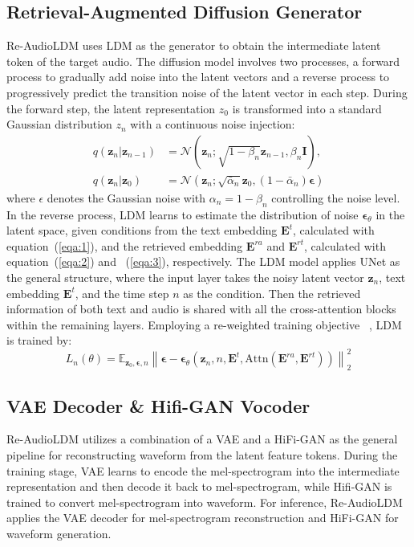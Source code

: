 \documentclass{article}
\begin{document}
\subsection{Retrieval-Augmented Diffusion Generator}
Re-AudioLDM uses LDM as the generator to obtain the intermediate latent token of the target audio. The diffusion model involves two processes, a forward process to gradually add noise into the latent vectors and a reverse process to progressively predict the transition noise of the latent vector in each step. During the forward step, the latent representation $z_0$ is transformed into a standard Gaussian distribution $z_n$ with a continuous noise injection:
\begin{align}
q(\boldsymbol{z}_{n}|\boldsymbol{z}_{n-1})&=\mathcal{N}(\boldsymbol{z}_{n};\sqrt{1-\beta_{n}}\boldsymbol{z}_{n-1},\beta_{n}\boldsymbol{I}), \\
\label{forwardprocess}
q(\boldsymbol{z}_{n}|\boldsymbol{z}_{0})&=\mathcal  N(\boldsymbol{z}_{n};\sqrt{\bar{\alpha}_{n}}\boldsymbol{z}_{0},(1-\bar{\alpha}_{n})\boldsymbol{\epsilon})
\end{align} 
\noindent
where $\epsilon$ denotes the Gaussian noise with ${\alpha}_{n} = 1 -\beta_{n}$ controlling the noise level. 
In the reverse process, LDM learns to estimate the distribution of noise $\boldsymbol{\epsilon}_{\theta}$ in the latent space, given conditions from the text embedding $\boldsymbol{E}^{t}$, calculated with equation~(\ref{eqa:1}), and the retrieved embedding $\boldsymbol{E}^{ra}$ and $\boldsymbol{E}^{rt}$, calculated with equation~(\ref{eqa:2}) and ~(\ref{eqa:3}), respectively.
The LDM model applies UNet as the general structure, where the input layer takes the noisy latent vector $\boldsymbol{z}_{n}$, text embedding $\boldsymbol{E}^{t}$, and the time step $\textit{n}$ as the condition. Then the retrieved information of both text and audio is shared with all the cross-attention blocks within the remaining layers. Employing a re-weighted training objective ~\cite{DDPM}, LDM is trained by:
\begin{equation}
\label{trainingobjective}
L_{n}(\theta)=\mathbb{E}_{\boldsymbol{z}_{0},\boldsymbol{\epsilon},n}\left \| \boldsymbol{\epsilon} - \boldsymbol{\epsilon}_{\theta}(\boldsymbol{z}_{n},n,\boldsymbol{E}^{t},\text{Attn}(\boldsymbol{E}^{ra},\boldsymbol{E}^{rt})) \right\|^2_{2}
\end{equation}


\subsection{VAE Decoder \& Hifi-GAN Vocoder}
\label{sec:pipline}
Re-AudioLDM utilizes a combination of a VAE and a HiFi-GAN as the general pipeline for reconstructing waveform from the latent feature tokens. During the training stage, VAE learns to encode the mel-spectrogram into the intermediate representation and then decode it back to mel-spectrogram, while Hifi-GAN is trained to convert mel-spectrogram into waveform. For inference, Re-AudioLDM applies the VAE decoder for mel-spectrogram reconstruction and HiFi-GAN for waveform generation. 
\end{document}
